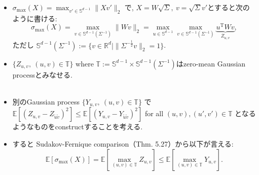 \documentclass[unicode,aspectratio=169,11pt]{beamer}
\newcommand{\ex}{\mathbb{E}}
\newcommand{\bb}{\mathbb}
\newcommand{\tr}{\mathrm{T}}
\begin{document}
\begin{frame}
  \begin{itemize}
    \item $\sigma_{\max}(X) = \max_{v' \in \bb{S}^{d-1}}\|Xv'\|_2$ で, $X = W\sqrt{\Sigma},\ v = \sqrt{\Sigma}v'$とすると次のように書ける:
          \[
            \sigma_{\max}(X) = \max_{v \in \bb{S}^{d-1}(\Sigma^{-1})} \|W v\|_2
            = \max_{u \in \bb{S}^{d-1}} \max_{v \in \bb{S}^{d-1}(\Sigma^{-1})} \underbrace{u^\tr W v}_{Z_{u,v}},
          \]
          ただし $\bb{S}^{d-1}(\Sigma^{-1}) := \{v \in \bb{R}^d \mid \|\Sigma^{-\frac{1}{2}}v\|_2 = 1\}$.
    \item $\{ Z_{u, v} ,\ (u, v) \in \bb{T}\}$ where $\bb{T} := \bb{S}^{d-1}\times \bb{S}^{d-1}(\Sigma^{-1})$はzero-mean Gaussian processとみなせる.\\
    　\\
    \item 別のGaussian process $\{Y_{u,v},\ (u,v)\in \bb{T}\}$ で $\ex[(Z_{u,v}-Z_{\tilde{u}\tilde{v}})^2] \le \ex[(Y_{u,v}-Y_{\tilde{u}\tilde{v}})^2]$
          for all $(u,v), (u',v') \in \bb{T}$ となるようなものをconstructすることを考える.
    \item すると Sudakov-Fernique comparison（Thm. 5.27）から以下が言える:
          \[ \ex[\sigma_{\max}(X)] = \ex\left[\max_{(u,v)\in \bb{T}} Z_{u,v}\right] \le \ex\left[\max_{(u,v)\in \bb{T}} Y_{u,v}\right]. \tag{6.17}\]
  \end{itemize}
\end{frame}
\end{document}
